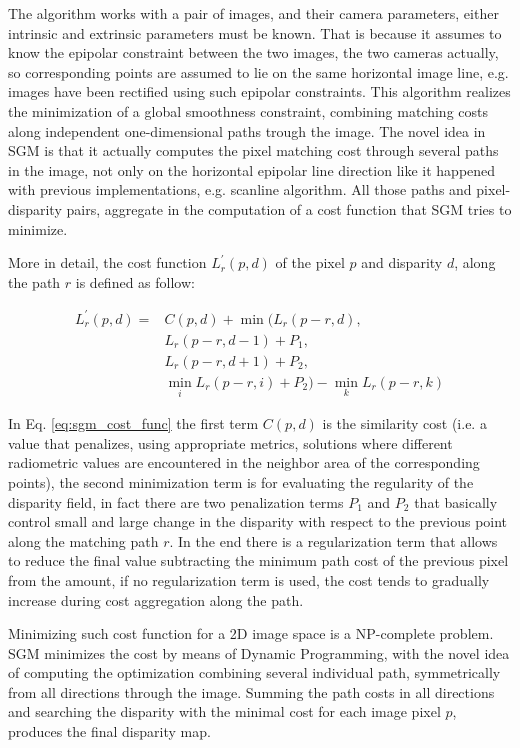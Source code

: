 The algorithm works with a pair of images, and their camera parameters, either intrinsic and extrinsic parameters must be known. That is because it assumes to know the epipolar constraint between the two images, the two cameras actually, so corresponding points are assumed to lie on the same horizontal image line, e.g. images have been rectified using such epipolar constraints. This algorithm realizes the minimization of a global smoothness constraint, combining matching costs along independent one-dimensional paths trough the image. The novel idea in SGM is that it actually computes the pixel matching cost through several paths in the image, not only on the horizontal epipolar line direction like it happened with previous implementations, e.g. scanline algorithm. All those paths and pixel-disparity pairs, aggregate in the computation of a cost function that SGM tries to minimize.

More in detail, the cost function $L^{\prime}_r(p, d)$ of the pixel $p$ and disparity $d$, along the path $r$ is defined as follow:

\begin{equation}\label{eq:sgm_cost_func}
    \begin{aligned}
    L^{\prime}_r(p, d) = &C(p, d) + 
    \min(L_r(p-r, d), \\
    &L_r(p-r, d-1)+P_1, \\
    &L_r(p-r, d+1)+P_2, \\
    &\min_iL_r(p-r,i)+P_2) - \min_kL_r(p-r,k)
    \end{aligned}
\end{equation}

In Eq. \ref{eq:sgm_cost_func} the first term $C(p, d)$ is the similarity cost (i.e. a value that penalizes, using appropriate metrics, solutions where different radiometric values are encountered in the neighbor area of the corresponding points), the second minimization term is for evaluating the regularity of the disparity field, in fact there are two penalization terms $P_1$ and $P_2$ that basically control small and large change in the disparity with respect to the previous point along the matching path $r$. In the end there is a regularization term that allows to reduce the final value subtracting the minimum path cost of the previous pixel from the amount, if no regularization term is used, the cost tends to gradually increase during cost aggregation along the path.

Minimizing such cost function for a 2D image space is a NP-complete problem. SGM minimizes the cost by means of Dynamic Programming, with the novel idea of computing the optimization combining several individual path, symmetrically from all directions through the image. Summing the path costs in all directions and searching the disparity with the minimal cost for each image pixel $p$, produces the final disparity map.

